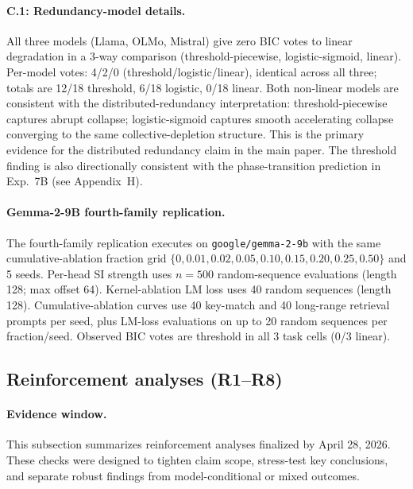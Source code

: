 \documentclass{article}
\begin{document}
\paragraph{C.1: Redundancy-model details.} All three models (Llama, OLMo, Mistral) give zero BIC votes
to linear degradation in a 3-way comparison (threshold-piecewise, logistic-sigmoid, linear).
Per-model votes: 4/2/0 (threshold/logistic/linear), identical across all three; totals
are 12/18 threshold, 6/18 logistic, 0/18 linear.
Both non-linear models are consistent with the distributed-redundancy interpretation:
threshold-piecewise captures abrupt collapse; logistic-sigmoid captures smooth
accelerating collapse converging to the same collective-depletion structure.
This is the primary evidence for the distributed redundancy claim in the main paper.
The threshold finding is also directionally consistent with the phase-transition
prediction in Exp.~7B (see Appendix~H).

\paragraph{Gemma-2-9B fourth-family replication.}
The fourth-family replication executes on \texttt{google/gemma-2-9b} with the same cumulative-ablation fraction grid
$\{0,0.01,0.02,0.05,0.10,0.15,0.20,0.25,0.50\}$ and 5 seeds.
Per-head SI strength uses $n=500$ random-sequence evaluations (length 128; max offset 64).
Kernel-ablation LM loss uses 40 random sequences (length 128).
Cumulative-ablation curves use 40 key-match and 40 long-range retrieval prompts per seed,
plus LM-loss evaluations on up to 20 random sequences per fraction/seed.
Observed BIC votes are threshold in all 3 task cells (0/3 linear).

\subsection{Reinforcement analyses (R1--R8)}
\label{app:reinforcement}

\paragraph{Evidence window.}
This subsection summarizes reinforcement analyses finalized by April 28, 2026. These checks were designed to tighten claim scope, stress-test key conclusions, and separate robust findings from model-conditional or mixed outcomes.
\end{document}
